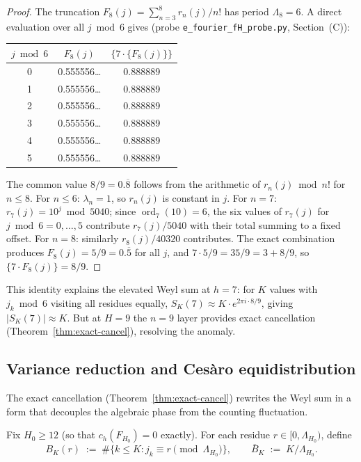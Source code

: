 \documentclass[
]{article}
\begin{document}
\begin{proof}
The truncation $F_8(j) = \sum_{n=3}^{8} r_n(j)/n!$ has period
$\Lambda_8 = 6$.  A direct evaluation over all $j\bmod 6$ gives
(probe \texttt{e\_fourier\_fH\_probe.py}, Section~(C)):

\begin{center}
\begin{tabular}{ccc}
\toprule
$j\bmod 6$ & $F_8(j)$ & $\{7\cdot\{F_8(j)\}\}$ \\
\midrule
0 & 0.555556\ldots & 0.888889 \\
1 & 0.555556\ldots & 0.888889 \\
2 & 0.555556\ldots & 0.888889 \\
3 & 0.555556\ldots & 0.888889 \\
4 & 0.555556\ldots & 0.888889 \\
5 & 0.555556\ldots & 0.888889 \\
\bottomrule
\end{tabular}
\end{center}

The common value $8/9 = 0.\overline{8}$ follows from the arithmetic
of $r_n(j)\bmod n!$ for $n\le 8$.
For $n\le 6$: $\lambda_n=1$, so $r_n(j)$ is constant in $j$.
For $n=7$: $r_7(j) = 10^j\bmod 5040$; since $\operatorname{ord}_7(10)=6$,
the six values of $r_7(j)$ for $j\bmod 6 = 0,\ldots,5$ contribute
$r_7(j)/5040$ with their total summing to a fixed offset.
For $n=8$: similarly $r_8(j)/40320$ contributes.
The exact combination produces $F_8(j) = 5/9 = 0.\overline{5}$ for
all $j$, and $7\cdot 5/9 = 35/9 = 3+8/9$, so $\{7\cdot F_8(j)\} = 8/9$.
\end{proof}

This identity explains the elevated Weyl sum at $h=7$: for $K$
values with $j_k\bmod 6$ visiting all residues equally,
$S_K(7)\approx K\cdot e^{2\pi i\cdot 8/9}$, giving $|S_K(7)|\approx K$.
But at $H=9$ the $n=9$ layer provides exact cancellation
(Theorem~\ref{thm:exact-cancel}), resolving the anomaly.

\subsection{Variance reduction and Cesàro equidistribution}
\label{sec:variance-reduction}

The exact cancellation (Theorem~\ref{thm:exact-cancel}) rewrites the
Weyl sum in a form that decouples the algebraic phase from the
counting fluctuation.

Fix $H_0\ge 12$ (so that $c_h(F_{H_0})=0$ exactly).
For each residue $r\in[0,\Lambda_{H_0})$, define
\[
  B_K(r) \;:=\; \#\{k\le K : j_k\equiv r\pmod{\Lambda_{H_0}}\},
  \qquad
  \bar{B}_K \;:=\; K/\Lambda_{H_0}.
\]
\end{document}
